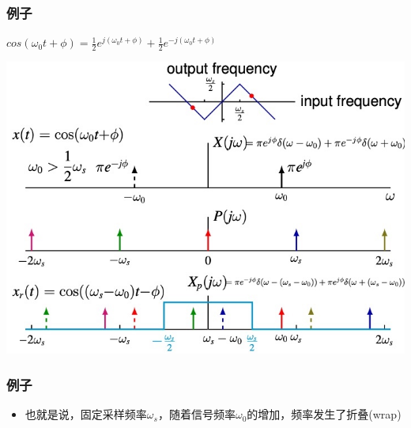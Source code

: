 \documentclass[CJKutf8,xcolor=pdftex,dvipsnames,table]{beamer}
\begin{document}
\begin{CJK*}{UTF8}{song}
\begin{frame}
  \end{frame}   
  
  \begin{frame}
    \frametitle{例子}
	$cos(\omega_0 t + \phi) = \frac{1}{2}e^{j(\omega_0 t+ \phi)}+\frac{1}{2}e^{-j(\omega_0 t+ \phi)}	$

    \begin{center}
    \includegraphics[scale=.42]{aliasing-example-4}
    \end{center}

  \end{frame}       
    	
  \begin{frame}
    \frametitle{例子}

	\begin{itemize}
	\item 也就是说，固定采样频率$\omega_s$，随着信号频率$\omega_0$的增加，频率发生了折叠(wrap)
	\end{itemize}

  \end{frame}   
	

\end{CJK*}
\end{document}

